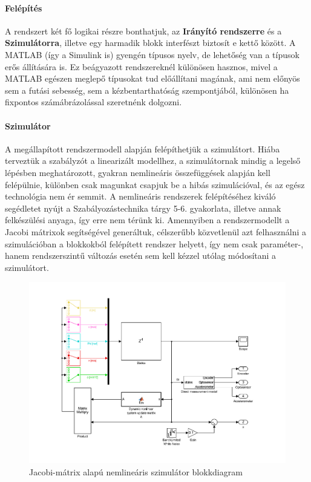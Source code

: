 \paragraph{Felépítés}

A rendszert két fő logikai részre bonthatjuk, az \textbf{Irányító rendszerre} és a \textbf{Szimulátorra}, illetve egy harmadik blokk interfészt biztosít e kettő között. A MATLAB (így a Simulink is) gyengén típusos nyelv, de lehetőség van a típusok erős állítására is. Ez beágyazott rendszereknél különösen hasznos, mivel a MATLAB egészen meglepő típusokat tud előállítani magának, ami nem előnyös sem a futási sebesség, sem a kézbentarthatóság szempontjából, különösen ha fixpontos számábrázolással szeretnénk dolgozni.

\paragraph{Szimulátor}

A megállapított rendszermodell alapján felépíthetjük a szimulátort. Hiába terveztük a szabályzót a linearizált modellhez, a szimulátornak mindig a legelső lépésben meghatározott, gyakran nemlineáris összefüggések alapján kell felépülnie, különben csak magunkat csapjuk be a hibás szimulációval, és az egész technológia nem ér semmit.
A nemlineáris rendszerek felépítéséhez kiváló segédletet nyújt a Szabályozástechnika tárgy 5-6. gyakorlata, illetve annak felkészülési anyaga\cite[p.~319-354]{szabtech}, így erre nem térünk ki. Amennyiben a rendszermodellt a Jacobi mátrixok segítségével generáltuk, célszerűbb közvetlenül azt felhasználni a szimulációban a blokkokból felépített rendszer helyett, így nem csak paraméter-, hanem rendszerszintű változás esetén sem kell kézzel utólag módosítani a szimulátort.

\begin{figure}[!ht]
    \centering
    \includegraphics[width=\linewidth]{img/sys}
    \centering
    \vspace{-30pt}
    \caption{Jacobi-mátrix alapú nemlineáris szimulátor blokkdiagram}
    \label{fig:model}
\end{figure}

